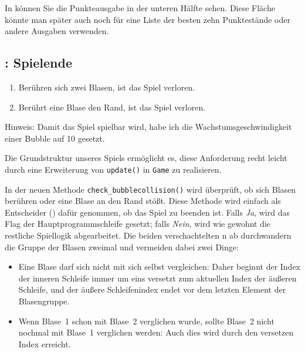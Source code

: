 
In  können Sie die Punkteausgabe in der unteren Hälfte sehen. Diese Fläche könnte man später auch noch für eine Liste der besten zehn Punktestände oder andere Ausgaben verwenden.


\subsection{: Spielende}
\begin{enumerate}
	\item Berühren sich zwei Blasen, ist das Spiel verloren.\label{reqSpielendeBlase}
	\item Berührt eine Blase den Rand, ist das Spiel verloren.\label{reqSpielendeRand}
\end{enumerate}
\er

Hinweis: Damit das Spiel spielbar wird, habe ich die Wachstumsgeschwindigkeit einer Bubble auf 10 gesetzt.



Die Grundstruktur unseres Spiels ermöglicht es, diese Anforderung recht leicht durch eine Erweiterung von \texttt{update()} in \texttt{Game} zu realisieren. 


In der neuen Methode \texttt{check\_\-bubble\-coll\-ision()} wird überprüft, ob sich Blasen berühren oder eine Blase an den Rand stößt. Diese Methode wird einfach als Entscheider () dafür genommen, ob das Spiel zu beenden ist. Falls \emph{Ja}, wird das Flag der Hauptprogrammschleife gesetzt; falls \emph{Nein}, wird wie gewohnt die restliche Spiellogik abgearbeitet. Die beiden verschachtelten \forSchleife n ab  durchwandern die Gruppe der Blasen zweimal und vermeiden dabei zwei Dinge:

\begin{itemize}
	\item Eine Blase darf sich nicht mit sich selbst vergleichen: Daher beginnt der Index der inneren Schleife immer um eins versetzt zum aktuellen Index der äußeren Schleife, und der äußere Schleifenindex endet vor dem letzten Element der Blasengruppe.
	
	\item Wenn Blase~1 schon mit Blase~2 verglichen wurde, sollte Blase~2 nicht nochmal mit Blase~1 verglichen werden: Auch dies wird durch den versetzen Index erreicht.
\end{itemize}


